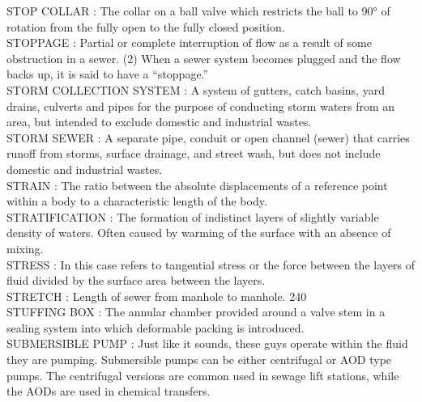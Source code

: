 \vspace{0.15cm}
STOP COLLAR :   The collar on a ball valve which restricts the ball to 90° of rotation from the fully open to the fully closed position.\\
\vspace{0.15cm}
STOPPAGE :   Partial or complete interruption of flow as a result of some obstruction in a sewer. (2) When a sewer system becomes plugged and the flow backs up, it is said to have a “stoppage.” \\
\vspace{0.15cm}
STORM COLLECTION SYSTEM :  A system of gutters, catch basins, yard drains, culverts and pipes for the purpose of conducting storm waters from an area, but intended to exclude domestic and industrial wastes. \\
\vspace{0.15cm}
STORM SEWER :  A separate pipe, conduit or open channel (sewer) that carries runoff from storms, surface drainage, and street wash, but does not include domestic and industrial wastes.\\
\vspace{0.15cm}
STRAIN :   The ratio between the absolute displacements of a reference point within a body to a characteristic length of the body.\\
\vspace{0.15cm}
STRATIFICATION :  The formation of indistinct layers of slightly variable density of waters. Often caused by warming of the surface with an absence of mixing.\\
\vspace{0.15cm}
STRESS :   In this case refers to tangential stress or the force between the layers of fluid divided by the surface area between the layers.\\
\vspace{0.15cm}
STRETCH :  Length of sewer from manhole to manhole. 240 \\
\vspace{0.15cm}
STUFFING BOX :   The annular chamber provided around a valve stem in a sealing system into which deformable packing is introduced.\\
\vspace{0.15cm}
SUBMERSIBLE PUMP :   Just like it sounds, these guys operate within the fluid they are pumping. Submersible pumps can be either centrifugal or AOD type pumps. The centrifugal versions are common used in sewage lift stations, while the AODs are used in chemical transfers.\\
\vspace{0.15cm}

